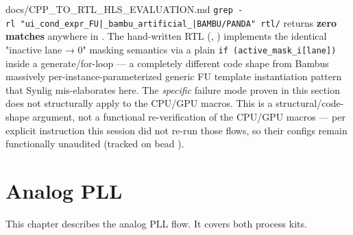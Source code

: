 \begin{relocated}{docs/CPP_TO_RTL_HLS_EVALUATION.md}
\texttt{grep\ -\allowbreak{}rl\ "ui\_\allowbreak{}cond\_\allowbreak{}expr\_\allowbreak{}FU|\_\allowbreak{}bambu\_\allowbreak{}artificial\_\allowbreak{}|BAMBU/\allowbreak{}PANDA"\ rtl/\allowbreak{}}
returns \textbf{zero matches} anywhere in . The hand-written
RTL (, ) implements the
identical "inactive lane → 0" masking semantics via a plain
\texttt{if\ (active\_\allowbreak{}mask\_\allowbreak{}i[lane])} inside a
generate/\allowbreak{}for-loop --- a completely different code shape
from Bambu\textquotesingle s massively per-instance-parameterized
generic FU template instantiation pattern that Synlig mis-elaborates
here. The \emph{specific} failure mode proven in this section does not
structurally apply to the CPU/GPU macros. This is a
structural/\allowbreak{}code-shape argument, not a functional
re-verification of the CPU/GPU macros --- per explicit instruction this
session did not re-run those flows, so their 
configs remain functionally unaudited (tracked on bead
).
\end{relocated}

\chapter{Analog PLL}\label{tm:ch:analog-pll}

This chapter describes the analog PLL flow. It covers both process kits.
